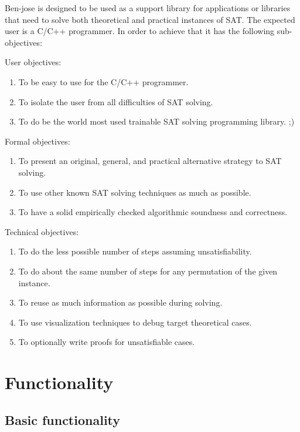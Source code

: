 \documentclass{easychair}
\begin{document}
Ben-jose is designed to be used as a support library for applications or libraries that need to solve both theoretical and practical instances of SAT. The expected user is a C/C++ programmer. In order to achieve that it has the following sub-objectives:

User objectives:
\begin{enumerate}
\item
To be easy to use for the C/C++ programmer.
\item
To isolate the user from all difficulties of SAT solving.
\item
To do be the world most used trainable SAT solving programming library. ;)
\end{enumerate}

Formal objectives:
\begin{enumerate}
\item
To present an original, general, and practical alternative strategy to SAT solving.
\item
To use other known SAT solving techniques as much as possible.
\item
To have a solid empirically checked algorithmic soundness and correctness.
\end{enumerate}

Technical objectives:
\begin{enumerate}
\item
To do the less possible number of steps assuming unsatisfiability.
\item
To do about the same number of steps for any permutation of the given instance.
\item
To reuse as much information as possible during solving.
\item
To use visualization techniques to debug target theoretical cases.
\item
To optionally write proofs for unsatisfiable cases.
\end{enumerate}

\section{Functionality}
\label{sect:funtionality}

\subsection{Basic functionality}
\label{sect:dimacs}
\end{document}
